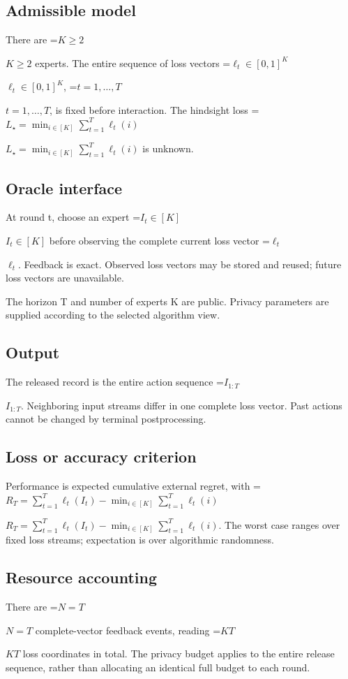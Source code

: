 \documentclass[10pt,a4paper]{article}
\newcommand{\AtlasMath}[1]{\par\begingroup\centering\setbox0=\hbox{$\displaystyle #1$}\ifdim\wd0>1.4\linewidth\typeout{ATLAS WIDE FORMULA: \the\wd0}\fi\ifdim\wd0>\linewidth\resizebox{\linewidth}{!}{\box0}\else\box0\fi\par\endgroup}
\newcommand{\AtlasInlineMath}[1]{\begingroup\setbox0=\hbox{$#1$}\ifdim\wd0>.4\linewidth\endgroup\AtlasMath{#1}\else\endgroup$#1$\fi}
\begin{document}
\subsection{Admissible model}
There are \AtlasInlineMath{K\ge2} experts. The entire sequence of loss vectors \AtlasInlineMath{\ell_t\in[0,1]^K}, \AtlasInlineMath{t=1,\ldots,T}, is fixed before interaction. The hindsight loss \AtlasInlineMath{L_\star=\min_{i\in[K]}\sum_{t=1}^T\ell_t(i)} is unknown.

\subsection{Oracle interface}
At round t, choose an expert \AtlasInlineMath{I_t\in[K]} before observing the complete current loss vector \AtlasInlineMath{\ell_t}. Feedback is exact. Observed loss vectors may be stored and reused; future loss vectors are unavailable.

The horizon T and number of experts K are public. Privacy parameters are supplied according to the selected algorithm view.

\subsection{Output}
The released record is the entire action sequence \AtlasInlineMath{I_{1:T}}. Neighboring input streams differ in one complete loss vector. Past actions cannot be changed by terminal postprocessing.

\subsection{Loss or accuracy criterion}
Performance is expected cumulative external regret, with \AtlasInlineMath{R_T=\sum_{t=1}^{T}\ell_t(I_t)-\min_{i\in[K]}\sum_{t=1}^{T}\ell_t(i)}. The worst case ranges over fixed loss streams; expectation is over algorithmic randomness.

\subsection{Resource accounting}
There are \AtlasInlineMath{N=T} complete-vector feedback events, reading \AtlasInlineMath{KT} loss coordinates in total. The privacy budget applies to the entire release sequence, rather than allocating an identical full budget to each round.
\end{document}
